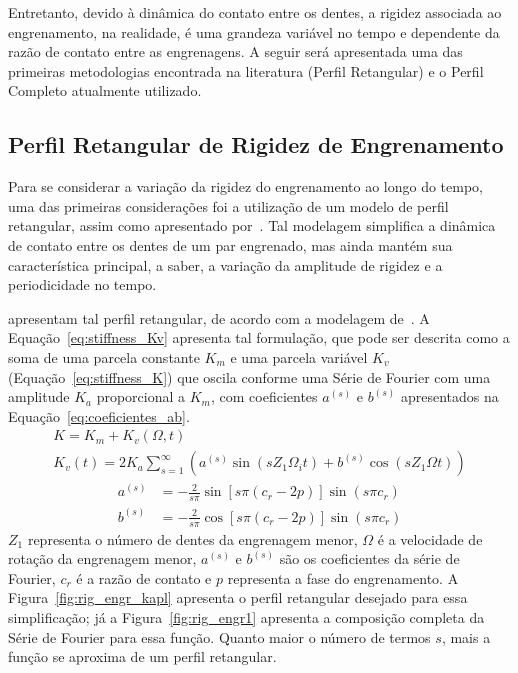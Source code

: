 Entretanto, devido à dinâmica do contato entre  os dentes, a rigidez associada ao engrenamento, na realidade, é uma grandeza variável no tempo e dependente da  razão de contato entre as engrenagens. A seguir será apresentada uma das primeiras metodologias encontrada na literatura (Perfil Retangular) e o Perfil Completo atualmente utilizado.

\subsection{Perfil Retangular de Rigidez de Engrenamento}

Para se considerar a variação da rigidez do engrenamento ao longo do tempo, uma das primeiras considerações foi a utilização de um modelo de perfil retangular, assim como apresentado por~. Tal modelagem simplifica a dinâmica de contato entre os dentes de um par engrenado,  mas ainda mantém sua característica principal, a saber, a variação da amplitude de rigidez e a periodicidade no tempo.

 apresentam tal perfil retangular, de acordo com a modelagem de~. A Equação~\ref{eq:stiffness_Kv} apresenta tal formulação, que pode ser descrita como a soma de uma parcela constante  $K_m$ e uma parcela variável $K_v$ (Equação~\ref{eq:stiffness_K}) que oscila conforme uma Série de Fourier com uma amplitude $K_a$ proporcional a $K_m$, com coeficientes $a^{(s)}$ e $b^{(s)}$ apresentados na Equação~\ref{eq:coeficientes_ab}.
\begin{gather} 
	\label{eq:stiffness_K}
	K = K_m + K_v(\Omega, t)
\\
	\label{eq:stiffness_Kv}
	K_v(t) = 2K_a \sum_{s=1}^{\infty} \left( a^{(s)} \sin(sZ_1\Omega_i t) + b^{(s)} \cos(sZ_1\Omega t) \right)
\end{gather}
\begin{align} \label{eq:coeficientes_ab}
	a^{(s)} &= -\frac{2}{s\pi} \sin[s\pi(c_r - 2p)] \sin(s\pi c_r) \nonumber \\
	b^{(s)} &= -\frac{2}{s\pi} \cos[s\pi(c_r - 2p)] \sin(s\pi c_r)
\end{align}
\newpage
$Z_1$ representa o número de dentes da engrenagem menor, $\Omega$ é a velocidade de rotação da engrenagem menor, $a^{(s)}$ e $b^{(s)}$ são os coeficientes da série de Fourier, $c_r$ é a razão de contato e $p$ representa a fase do engrenamento. A Figura~\ref{fig:rig_engr_kapl} apresenta o perfil retangular desejado para essa simplificação; já a Figura~\ref{fig:rig_engr1} apresenta a composição completa da Série de Fourier para essa função. Quanto maior o número de termos $s$, mais a função se aproxima de um perfil retangular. 


